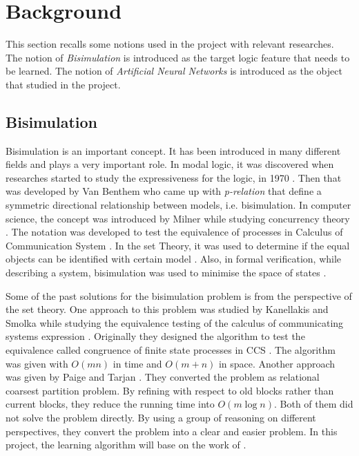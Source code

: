\section{Background}
\label{sec:background}


This section recalls some notions used in the project with relevant researches.
The notion of \emph{Bisimulation} is introduced as the target logic feature that needs to be learned.
The notion of \emph{Artificial Neural Networks} is introduced as the object that studied in the project.


\subsection{Bisimulation}\label{sec:bac:bis}
Bisimulation is an important concept. 
It has been introduced in many different fields and plays a very important role.
In modal logic, it was discovered when researches started to study the expressiveness for the logic, in 1970 \cite{Sangiorgi2009}.
Then that was developed by Van Benthem \cite{VanBenthem1976} who came up with \emph{p-relation} that define a symmetric directional relationship between models, i.e. bisimulation.
In computer science, the concept was introduced by Milner while studying concurrency theory \cite{Milner1990}.
The notation was developed to test the equivalence of processes in Calculus of Communication System \cite{Park1981}.
In the set Theory, it was used to determine if the equal objects can be identified with certain model \cite{Sangiorgi2009}.
Also, in formal verification, while describing a system, bisimulation was used to minimise the space of states \cite{Roscoe1994}.

Some of the past solutions for the bisimulation problem is from the perspective of the set theory.
One approach to this problem was studied by Kanellakis and Smolka while studying the equivalence testing of the calculus of communicating systems expression \cite{Milner1980}.
Originally they designed the algorithm to test the equivalence called congruence of finite state processes in CCS \cite{Paige1987}.
The algorithm was given with $O(mn)$ in time and $O(m+n)$ in space.
Another approach was given by Paige and Tarjan \cite{Paige1987}.
They converted the problem as relational coarsest partition problem.
By refining with respect to old blocks rather than current blocks, they reduce the running time into $O(m\log n)$.
Both of them did not solve the problem directly. 
By using a group of reasoning on different perspectives, they convert the problem into a clear and easier problem. 
In this project, the learning algorithm will base on the work of \cite{Paige1987}.

